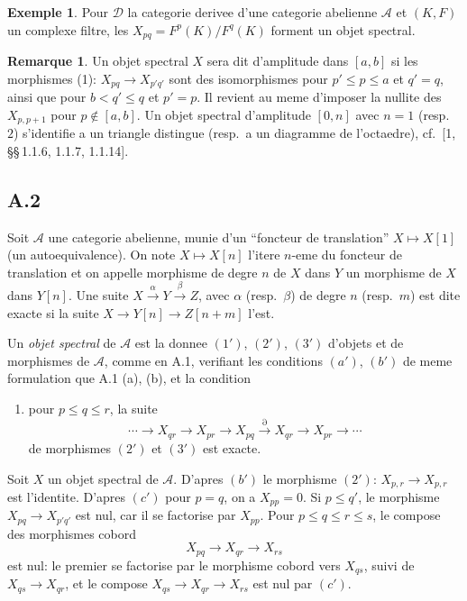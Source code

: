 \documentclass[11pt,a4paper]{article}
\theoremstyle{plain}
\theoremstyle{definition}
\newtheorem{example}[theorem]{Exemple}
\newtheorem{remark}[theorem]{Remarque}
\newcommand{\cD}{\mathscr{D}}
\newcommand{\cA}{\mathscr{A}}
\begin{document}
\begin{example}
Pour $\cD$ la categorie derivee d'une categorie abelienne $\cA$ et $(K,F)$ un complexe filtre, les $X_{pq} = F^p(K)/F^q(K)$ forment un objet spectral.
\end{example}

\begin{remark}
Un objet spectral $X$ sera dit d'amplitude dans $[a,b]$ si les morphismes (1): $X_{pq} \to X_{p'q'}$ sont des isomorphismes pour $p' \leqslant p \leqslant a$ et $q' = q$, ainsi que pour $b < q' \leqslant q$ et $p' = p$. Il revient au meme d'imposer la nullite des $X_{p,p+1}$ pour $p \notin [a,b]$. Un objet spectral d'amplitude $[0,n]$ avec $n=1$ (resp.~$2$) s'identifie a un triangle distingue (resp.~a un diagramme de l'octaedre), cf.~[1, \S\S\,1.1.6, 1.1.7, 1.1.14].
\end{remark}

\subsection*{A.2}
Soit $\cA$ une categorie abelienne, munie d'un ``foncteur de translation'' $X \mapsto X[1]$ (un autoequivalence). On note $X \mapsto X[n]$ l'itere $n$-eme du foncteur de translation et on appelle morphisme de degre $n$ de $X$ dans $Y$ un morphisme de $X$ dans $Y[n]$. Une suite $X \xrightarrow{\alpha} Y \xrightarrow{\beta} Z$, avec $\alpha$ (resp.~$\beta$) de degre $n$ (resp.~$m$) est dite exacte si la suite $X \to Y[n] \to Z[n+m]$ l'est.

Un \emph{objet spectral} de $\cA$ est la donnee $(1')$, $(2')$, $(3')$ d'objets et de morphismes de $\cA$, comme en A.1, verifiant les conditions $(a')$, $(b')$ de meme formulation que A.1 (a), (b), et la condition
\begin{enumerate}[label=$(c')$]
\item pour $p \leqslant q \leqslant r$, la suite
\[
\cdots \to X_{qr} \to X_{pr} \to X_{pq} \xrightarrow{\partial} X_{qr} \to X_{pr} \to \cdots
\]
de morphismes $(2')$ et $(3')$ est exacte.
\end{enumerate}

Soit $X$ un objet spectral de $\cA$. D'apres $(b')$ le morphisme $(2')$: $X_{p,r} \to X_{p,r}$ est l'identite. D'apres $(c')$ pour $p=q$, on a $X_{pp} = 0$. Si $p \leqslant q'$, le morphisme $X_{pq} \to X_{p'q'}$ est nul, car il se factorise par $X_{pp}$. Pour $p \leqslant q \leqslant r \leqslant s$, le compose des morphismes cobord
\[
X_{pq} \to X_{qr} \to X_{rs}
\]
est nul: le premier se factorise par le morphisme cobord vers $X_{qs}$, suivi de $X_{qs} \to X_{qr}$, et le compose $X_{qs} \to X_{qr} \to X_{rs}$ est nul par $(c')$.
\end{document}
